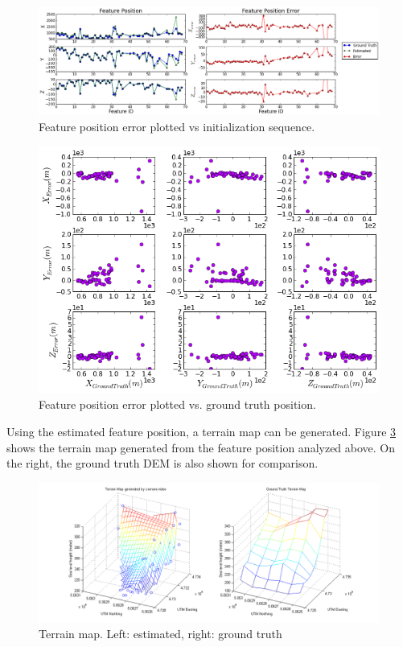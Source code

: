 \begin{figure}[h]
\centering
\includegraphics[width=14cm, keepaspectratio=true]
{./Figures/fltfig/cut1/Figure60.png}
\caption{Feature position error plotted vs initialization sequence. }
\label{fltfig:9}
\end{figure}

\begin{figure}[h]
\centering
\includegraphics[width=14cm, keepaspectratio=true]
{./Figures/fltfig/cut1/Figure80.png}
\caption{Feature position error plotted vs. ground truth position. }
\label{fltfig:err_vs_gtpos}
\end{figure}

Using the estimated feature position, a terrain map can be generated.
Figure \ref{fltfig:10} shows the terrain map generated from the
feature position analyzed above. On the right, the ground truth DEM is
also shown for comparison. 

\begin{figure}[h]
\centering
\includegraphics[width=14cm, keepaspectratio=true]
{./Figures/fltfig/cut1/terrain/terrain_map_cmp.png}
\caption{Terrain map. Left: estimated, right: ground truth }
\label{fltfig:10}
\end{figure}
\FloatBarrier

